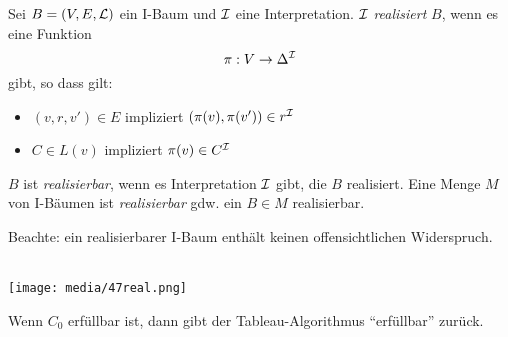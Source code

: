 \begin{definition}[Realisierbarkeit]
    \label{def:realisierbarkeit}
Sei $B = \left( V,E,\ML \right)$ ein I-Baum und $\mathcal{I}$ eine Interpretation. $\mathcal{I}$
\emph{realisiert} $B$, wenn es eine Funktion
\[ \pi : V \rightarrow \Delta^{\mathcal{I}} \]
gibt, so dass gilt:
\begin{itemize}
\item
  $\left( v,r,v' \right) \in E$ impliziert
  $\left( \pi\left( v \right),\pi\left( v' \right) \right) \in r^\MI$
\item
  $C \in L\left( v \right)$ impliziert
  $\pi\left( v \right) \in C^\MI$
\end{itemize}

$B$ ist \emph{realisierbar}, wenn es Interpretation $\mathcal{I}$ gibt, die $B$
realisiert. Eine Menge $M$ von I-Bäumen ist \emph{realisierbar} gdw. ein
$B \in M$ realisierbar.
\end{definition}

Beachte: ein realisierbarer I-Baum enthält keinen offensichtlichen Widerspruch.

\begin{tafel}\mbox{}\\

\texttt{[image: media/47real.png]}
\end{tafel}

\begin{theorem}
    Wenn $C_{0}$ erfüllbar ist, dann gibt der Tableau-Algorithmus \enquote{erfüllbar}
zurück.
\end{theorem}

